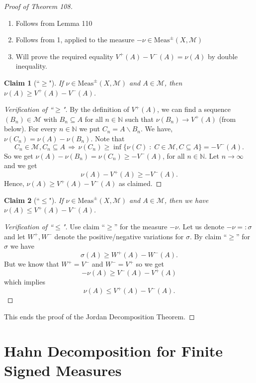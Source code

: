 \documentclass[letterpaper, 12pt]{article}
\newcommand{\st}{\; : \; }
\newcommand{\cM}{\mathcal{M}}
\newcommand{\bN}{\mathbb{N}}
\newcommand{\Meas}{\mathrm{Meas}}
\theoremstyle{stdthm}
\theoremstyle{stddef}
\theoremstyle{stdnonum}
\newtheorem{claim}{Claim}
\theoremstyle{stdqands}
\theoremstyle{stdbold}
\begin{document}
\begin{proof} [Proof of Theorem 108] $ $
\begin{enumerate}
\item Follows from Lemma 110
\item Follows from 1, applied to the measure $-\nu \in \Meas^\pm (X, \cM)$
\item Will prove the required equality $V^+(A) - V^-(A) = \nu(A)$ by double inequality. 
\end{enumerate}

\begin{claim}[``$\geq$"]
If $\nu \in \Meas^\pm(X,\cM)$ and  $A \in \cM$, then $\nu(A)\geq V^+(A) - V^-(A)$. 
\end{claim}

\begin{proof}[Verification of ``$\geq$"]
By the definition of $V^+(A)$, we can find a sequence $(B_n) \in \cM$ with $B_n \subseteq A$ for all $n \in \bN$ such that $\nu(B_n) \rightarrow V^+(A)$ (from below). For every $n \in \bN$ we put $C_n = A\backslash B_n$. We have, $\nu(C_n) = \nu(A) - \nu(B_n)$. Note that 
\[
C_n \in \cM, C_n \subseteq A \, \Longrightarrow\, \nu(C_n) \geq \inf \{ \nu(C)\st C \in \cM, C \subseteq A \} = - V^- (A).
\]
So we get $\nu(A) - \nu(B_n) = \nu(C_n)\geq - V^-(A)$, for all $n \in \bN$. Let $n \rightarrow \infty$ and we get 
\[ \nu(A) - V^+(A) \geq -V^-(A). \] 
Hence, $\nu(A) \geq V^+(A) - V^-(A)$ as claimed.
\end{proof}  

\begin{claim}[``$\leq$"]
If $\nu \in \Meas^\pm (X,\cM)$ and $A \in \cM$, then we have $\nu(A) \leq V^+(A) - V^-(A)$.
\end{claim}

\begin{proof}[Verification of ``$\leq$"]
Use claim ``$\geq$'' for the measure $-\nu$. Let us denote $-\nu=: \sigma$ and let $W^+,W^-$ denote the positive/negative variations for $\sigma$. By claim ``$\geq$'' for $\sigma$ we have
\[\sigma(A)\geq W^+(A) - W^-(A).\]
But we know that $W^+ = V^-$ and $W^- = V^+$ so we get 
\[-\nu(A)\geq V^-(A) - V^+(A)\]
which implies
\[\nu(A) \leq V^+(A) - V^-(A).\]
\end{proof}
This ends the proof of the Jordan Decomposition Theorem. 
\end{proof}

\newpage 


\section{Hahn Decomposition for Finite Signed Measures}
\end{document}
